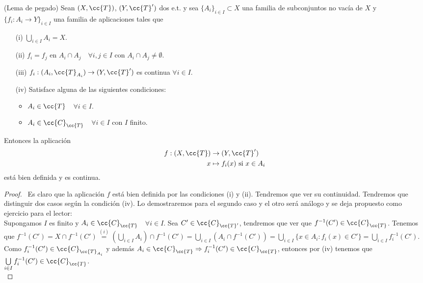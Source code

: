 \begin{lema} (Lema de pegado) Sean $(X, \cc{T})$, $(Y, \cc{T}')$ dos e.t. y sea $\{A_i\}_{i\in I}\subset X$ una familia de subconjuntos no vacía de $X$ y $\{f_i:A_i \to Y\}_{i\in I}$ una familia de aplicaciones tales que 
    \begin{enumerate}
        \item[(i)] $\bigcup\limits_{i\in I} A_i =X$.
        \item[(ii)] $f_i=f_j$ en $A_i\cap A_j$\ \ $\forall i,j\in I$ con $A_i\cap A_j \neq \emptyset$. 
        \item[(iii)] $f_i:(A_i, \cc{T}_{A_i})\to (Y, \cc{T}')$ es continua $\forall i \in I$. 
        \item[(iv)] Satisface alguna de las siguientes condiciones:
        \begin{itemize}
            \item $A_i\in \cc{T}$\ \ $\forall i \in I$.
            \item $A_i \in \cc{C}_{\cc{T}}$\ \ $\forall i \in I$ con $I$ finito. 
        \end{itemize}
    \end{enumerate}
    Entonces la aplicación 
    \begin{align*}
        f:(X, \cc{T})&\to (Y, \cc{T}')\\
        x &\mapsto f_i(x) \text{ si }x\in A_i
    \end{align*}
    está bien definida y es continua.
    \begin{proof}\
        Es claro que la aplicación $f$ está bien definida por las condiciones (i) y (ii). Tendremos que ver su continuidad. Tendremos que distinguir dos casos según la condición (iv). Lo demostraremos para el segundo caso y el otro será análogo y se deja propuesto como ejercicio para el lector:\\

        Supongamos $I$ es finito y $A_i\in \cc{C}_{\cc{T}}$\ \ $\forall i \in I$. Sea $C'\in \cc{C}_{\cc{T}'}$, tendremos que ver que $f^{-1}(C')\in \cc{C}_{\cc{T}}$. Tenemos que $f^{-1}(C') = X\cap f^{-1}(C')\overset{(i)}{=}\left(\bigcup\limits_{i\in I}A_i\right)\cap f^{-1}(C') = \bigcup\limits_{i\in I}(A_i\cap f^{-1}(C')) = \bigcup\limits_{i\in I}\{x\in A_i : f_i(x)\in C'\} = \bigcup\limits_{i\in I} f_i^{-1}(C')$. Como $f_i^{-1}(C')\in \cc{C}_{\cc{T}_{A_i}}$ y además $A_i\in \cc{C}_{\cc{T}}\Rightarrow f_i^{-1}(C')\in \cc{C}_{\cc{T}}$, entonces por (iv) tenemos que $\bigcup\limits_{i\in I} f_i^{-1}(C')\in \cc{C}_{\cc{T}}$.\\
    \end{proof}
\end{lema}

